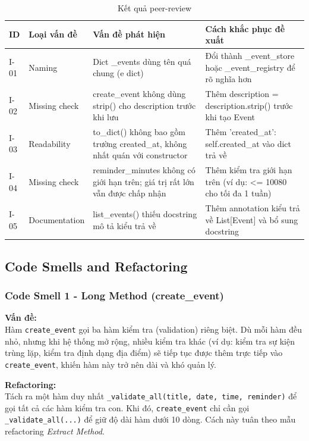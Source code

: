 \begin{table}[H]
\centering
\begin{tabularx}{\linewidth}{|l|l|X|X|}
\hline
\textbf{ID} & \textbf{Loại vấn đề} & \textbf{Vấn đề phát hiện} & \textbf{Cách khắc phục đề xuất} \\
\hline
I-01 & Naming & Dict \_events dùng tên quá chung (e dict) & Đổi thành \_event\_store hoặc \_event\_registry để rõ nghĩa hơn \\
\hline
I-02 & Missing check & create\_event không dùng strip() cho description trước khi lưu & Thêm description = description.strip() trước khi tạo Event \\
\hline
I-03 & Readability & to\_dict() không bao gồm trường created\_at, không nhất quán với constructor & Thêm 'created\_at': self.created\_at vào dict trả về \\
\hline
I-04 & Missing check & reminder\_minutes không có giới hạn trên; giá trị rất lớn vẫn được chấp nhận & Thêm kiểm tra giới hạn trên (ví dụ: <= 10080 cho tối đa 1 tuần) \\
\hline
I-05 & Documentation & list\_events() thiếu docstring mô tả kiểu trả về & Thêm annotation kiểu trả về List[Event] và bổ sung docstring \\
\hline
\end{tabularx}
\caption{Kết quả peer-review}
\end{table}

\subsection{Code Smells and Refactoring}
\subsubsection{Code Smell 1 - Long Method (create\_event)}
\noindent\textbf{Vấn đề:} \\
Hàm \texttt{create\_event} gọi ba hàm kiểm tra (validation) riêng biệt. Dù mỗi hàm đều nhỏ, nhưng khi hệ thống mở rộng, nhiều kiểm tra khác (ví dụ: kiểm tra sự kiện trùng lặp, kiểm tra định dạng địa điểm) sẽ tiếp tục được thêm trực tiếp vào \texttt{create\_event}, khiến hàm này trở nên dài và khó quản lý.

\vspace{5pt}

\noindent\textbf{Refactoring:} \\
Tách ra một hàm duy nhất \texttt{\_validate\_all(title, date, time, reminder)} để gọi tất cả các hàm kiểm tra con. Khi đó, \texttt{create\_event} chỉ cần gọi \texttt{\_validate\_all(...)} để giữ độ dài hàm dưới 10 dòng. Cách này tuân theo mẫu refactoring \textit{Extract Method}.

